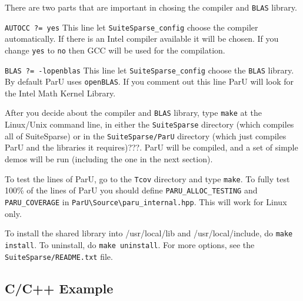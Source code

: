 \documentclass[12pt]{article}
\begin{document}
There are two parts that are important in chosing the compiler and 
\verb'BLAS' library.


\verb 'AUTOCC ?= yes' This line let \verb'SuiteSparse_config' choose the 
compiler automatically. If there is an Intel compiler available it will be chosen. 
If you change \verb'yes' to \verb'no' then GCC will be used for the compilation.


\verb 'BLAS ?= -lopenblas' This line let \verb'SuiteSparse_config' choose the 
\verb'BLAS' library. By default ParU uses  \verb'openBLAS'. If you comment out
this line ParU will look for the Intel Math Kernel Library. 

After you decide about the compiler and \verb'BLAS' library, type \verb'make' at 
the Linux/Unix command line, in either the 
\verb'SuiteSparse' directory (which compiles all of SuiteSparse) or in the 
\verb'SuiteSparse/ParU' directory (which just compiles ParU and the 
libraries it requires)???.  ParU will be compiled, and a set of simple demos 
will be run (including the one in the next section).

To  test the lines of ParU, go to the \verb'Tcov'
directory and type \verb'make'.  To fully test 100\% of the lines of ParU you 
should define \verb'PARU_ALLOC_TESTING' and \verb'PARU_COVERAGE' in
\verb'ParU\Source\paru_internal.hpp'.
This will work for Linux only.

To install the shared library
into /usr/local/lib and /usr/local/include, do {\tt make install}.
To uninstall, do {\tt make uninstall}.
For more options, see the {\tt SuiteSparse/README.txt} file.

\subsection{C/C++ Example}
\end{document}
